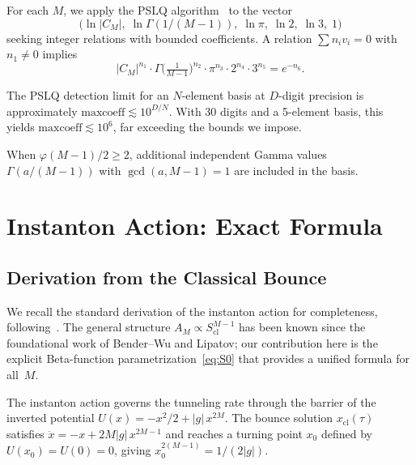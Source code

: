 \documentclass[12pt,a4paper]{article}
\numberwithin{equation}{section}
\theoremstyle{plain}
\theoremstyle{definition}
\theoremstyle{remark}
\begin{document}
For each $M$, we apply the PSLQ algorithm~\cite{FergusonBailey} to the vector
\begin{equation}\label{eq:pslq-basis}
  \bigl(\ln |C_M|,\; \ln \Gamma(1/(M{-}1)),\; \ln\pi,\; \ln 2,\; \ln 3,\; 1\bigr)
\end{equation}
seeking integer relations with bounded coefficients. A relation
$\sum n_i v_i = 0$ with $n_1 \ne 0$ implies
\[
  |C_M|^{n_1} \cdot \Gamma\!\bigl(\tfrac{1}{M-1}\bigr)^{n_2}
  \cdot \pi^{n_3} \cdot 2^{n_4} \cdot 3^{n_5} = e^{-n_6}.
\]

The PSLQ detection limit for an $N$-element basis at $D$-digit precision is
approximately $\mathrm{maxcoeff} \lesssim 10^{D/N}$. With 30 digits and
a 5-element basis, this yields
$\mathrm{maxcoeff} \lesssim 10^6$, far exceeding the bounds we impose.

When $\varphi(M{-}1)/2 \ge 2$, additional independent Gamma values
$\Gamma(a/(M{-}1))$ with $\gcd(a, M{-}1) = 1$ are included in the basis.

\section{Instanton Action: Exact Formula}
\label{sec:instanton}

\subsection{Derivation from the Classical Bounce}
\label{sec:bounce}

We recall the standard derivation of the instanton action for
completeness, following~\cite{BW1973,ZJ2004,CostinCostin2020}.
The general structure $A_M \propto S_{\mathrm{cl}}^{M-1}$ has been known
since the foundational work of Bender--Wu and Lipatov; our contribution
here is the explicit Beta-function parametrization~\eqref{eq:S0} that
provides a unified formula for all~$M$.

The instanton action governs the tunneling rate through the barrier of
the inverted potential $U(x) = -x^2/2 + |g|\,x^{2M}$. The bounce solution
$x_{\mathrm{cl}}(\tau)$ satisfies $\ddot{x} = -x + 2M|g|\,x^{2M-1}$ and
reaches a turning point $x_0$ defined by $U(x_0) = U(0) = 0$, giving
$x_0^{2(M-1)} = 1/(2|g|)$.
\end{document}

